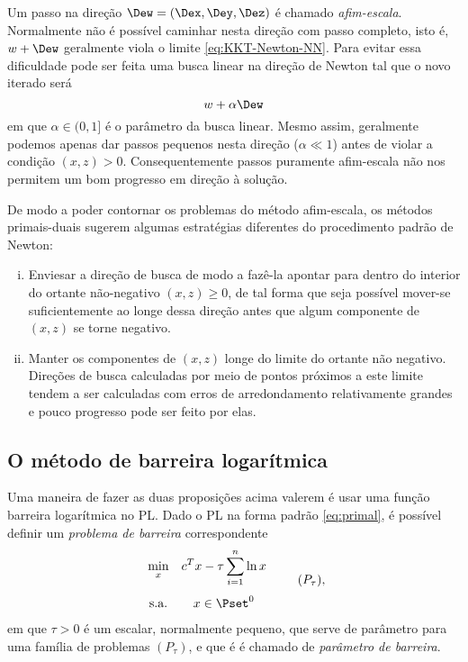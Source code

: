 Um passo na direção $\Dew = (\Dex,\Dey,\Dez)$ é chamado \emph{afim-escala}. Normalmente não é
possível caminhar nesta direção com passo completo, isto é, $w + \Dew$
geralmente viola o limite \eqref{eq:KKT-Newton-NN}. Para evitar essa dificuldade
pode ser feita uma busca linear na direção de Newton tal que o novo iterado
será \[ w + \alpha\Dew \] em que $\alpha \in (0,1]$ é o parâmetro da busca
linear. Mesmo assim, geralmente podemos apenas dar passos pequenos nesta direção
($\alpha \ll 1$) antes de violar a condição $(x,z) > 0$. Consequentemente passos
puramente afim-escala não nos permitem um bom progresso em direção à solução.


 De modo a poder contornar os problemas do método afim-escala, os métodos
 primais-duais sugerem algumas estratégias diferentes do  procedimento padrão de
 Newton:
 \begin{enumerate}[(i)]
\item Enviesar a direção de busca de modo a fazê-la apontar para dentro do
interior do ortante não-negativo $(x,z)\geq 0$, de tal forma que seja possível
mover-se suficientemente ao longe dessa direção antes que algum componente de
$(x,z)$ se torne negativo.
\item Manter os componentes de $(x,z)$  longe do limite do ortante não negativo.
Direções de busca calculadas por meio de pontos próximos a este limite tendem a
ser calculadas com erros de arredondamento relativamente grandes e pouco
progresso pode ser feito por elas.
 \end{enumerate}
 
 
 \subsection{O método de barreira logarítmica}
\label{subsec:barrier-problem}


Uma maneira de fazer  as duas proposições acima valerem é usar  uma
função barreira logarítmica no \ac{PL}. Dado o \ac{PL} na forma padrão \eqref{eq:primal}, é
possível definir um \emph{problema de barreira} correspondente 
\begin{equation}
\begin{array}{cc}
\displaystyle \min_{x} & \displaystyle c^Tx - \tau\sum_{i=1}^n \ln x \\[6mm]
\text{s.a.} & x\in\Pset^0
\end{array}\tag{$P_\tau$},
\label{eq:primal-barrier}
\end{equation}
em que $\tau > 0$ é um escalar, normalmente pequeno, que serve de parâmetro para
uma família de problemas $(P_\tau)$, e que é é chamado de
\emph{parâmetro de barreira}.

